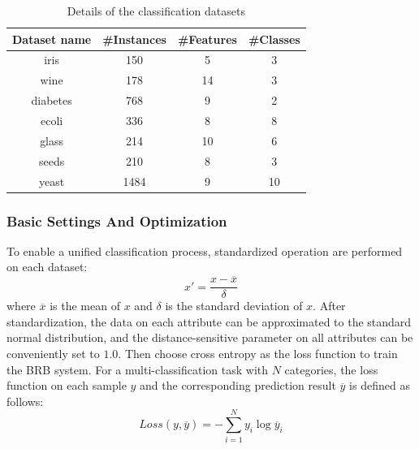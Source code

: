 \documentclass{ieeeaccess}
\begin{document}
\begin{table}
    \caption{Details of the classification datasets}
    \centering
    \normalsize
    \label{tab4}
    \begin{tabular}{cccc}
        \hline
        Dataset name & \#Instances & \#Features & \#Classes \\
        \hline
        iris         & 150         & 5          & 3         \\
        wine         & 178         & 14         & 3         \\
        diabetes     & 768         & 9          & 2         \\
        ecoli        & 336         & 8          & 8         \\
        glass        & 214         & 10         & 6         \\
        seeds        & 210         & 8          & 3         \\
        yeast        & 1484        & 9          & 10        \\
        \hline
    \end{tabular}
\end{table}



\subsubsection{Basic Settings And Optimization}
To enable a unified classification process,  standardized operation are performed on each dataset:
\begin{equation}
    x'=\frac{x-\overline{x}}{\delta}
\end{equation}
where $\overline{x}$ is the mean of $x$ and $\delta$ is the standard deviation of $x$.
After standardization, the data on each attribute can be approximated to the standard normal distribution,
and the distance-sensitive parameter on all attributes can be conveniently set to $1.0$.
Then choose cross entropy as the loss function to train the BRB system.
For a multi-classification task with $N$ categories, the loss function on each sample $y$ and the corresponding prediction result $\overline{y}$ is defined as follows:
\begin{equation}
    Loss(y,\overline{y})=-\sum_{i=1}^Ny_{i}\log\overline{y}_i
\end{equation}
\end{document}
